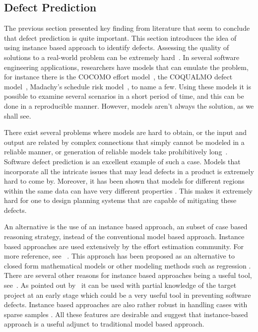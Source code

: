 \documentclass[10pt, journal, compsoc]{IEEEtran}
\begin{document}
\subsection{Defect Prediction}
The previous section presented key finding from literature that seem to conclude that defect prediction is quite important. This section introduces the idea of using instance based approach to identify defects. Assessing the quality of solutions to a real-world problem can be extremely hard~\cite{menzies2005xomo}. In several software engineering applications, researchers have models that can emulate the problem, for instance there is the COCOMO effort model~\cite[p29-57]{boehm2009software}, the COQUALMO defect model~\cite[p254-268]{boehm2009software}, Madachy’s schedule risk model~\cite[p284-291]{boehm2009software}, to name a few. Using these models it is possible to examine several scenarios in a short period of time, and this can be done in a reproducible manner. However, models aren't always the solution, as we shall see. 

There exist several problems where models are hard to obtain, or the input and output are related by complex connections that simply cannot be modeled in a reliable manner, or generation of reliable models take prohibitively long~\cite{Ludewig2003}. Software defect prediction is an excellent example of such a case. Models that incorporate all the intricate issues that may lead defects in a product is extremely hard to come by. Moreover, it has been shown that models for different regions within the same data can have very different properties \cite{localvsglobal}. This makes it extremely hard for one to design planning systems that are capable of mitigating these defects.

An alternative is the use of an instance based approach, an subset of case based reasoning strategy, instead of the conventional model based approach. Instance based approaches are used extensively by the effort estimation community. For more reference, see ~\cite{keung2008analogy, 6600685, walkerden1999empirical, shepperd1997estimating, kocaguneli2010use}. This approach has been proposed as an alternative to closed form mathematical models or other modeling methods such as regression \cite{keung2008analogy}. There are several other reasons for instance based approaches being a useful tool, see~\cite{6600685}. As pointed out by~\cite{walkerden1999empirical} it can be used with partial knowledge of the target project at an early stage which could be a very useful tool in preventing software defects. Instance based approaches are also rather robust in handling cases with sparse samples \cite{1438374}. All these features are desirable and suggest that instance-based approach is a useful adjunct to traditional model based approach. 
 
\end{document}
